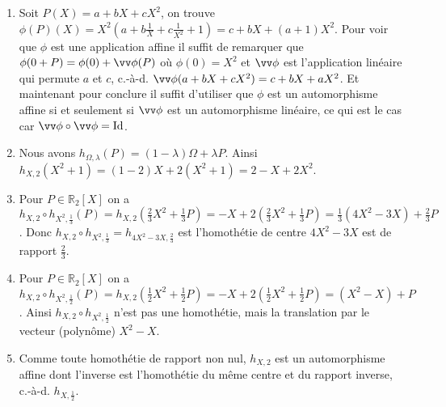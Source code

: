\documentclass[a4paper,12pt,reqno]{amsart}
\begin{document}
\begin{solution}
  \begin{enumerate}
    \item Soit $P(X)=a+bX+cX^{2}$, on trouve $\phi(P)(X) = X^{2}\left( a+b\frac{1}{X}+c\frac{1}{X^{2}} + 1 \right) = c+bX+(a+1)X^{2}$. Pour voir que $\phi$ est une application affine il suffit de remarquer que $\phi(0+P) = \phi(0) + \vv\phi(P)$ où $\phi(0) = X^{2}$ et $\vv\phi$ est l'application linéaire qui permute $a$ et $c$, c.-à-d. $\vv\phi(a+bX+cX^{2}) = c+bX+aX^{2}$. Et maintenant pour conclure il suffit d'utiliser que $\phi$ est un automorphisme affine si et seulement si $\vv\phi$ est un automorphisme linéaire, ce qui est le cas car $\vv\phi\circ\vv\phi=\id$.
    \item Nous avons $h_{\Omega,\lambda}(P) = (1- \lambda)\Omega+\lambda P$. Ainsi $h_{X,2}(X^{2}+1) = (1-2)X+2(X^{2}+1) = 2-X+2X^{2}$.
    \item Pour $P \in \mathbb{R}_{2}[X]$ on a $h_{X,2}\circ h_{X^{2},\frac{1}{3}}(P) = h_{X,2}\left(\frac{2}{3}X^{2}+\frac{1}{3}P\right) = -X+2\left(\frac{2}{3}X^{2}+\frac{1}{3}P\right)= \frac{1}{3}\left( 4X^{2}-3X \right)+\frac{2}{3}P$. Donc $h_{X,2}\circ h_{X^{2},\frac{1}{3}} = h_{4X^{2}-3X,\frac{2}{3}}$ est l'homothétie de centre $4X^{2}-3X$ est de rapport $\frac{2}{3}$.
    \item Pour $P \in \mathbb{R}_{2}[X]$ on a $h_{X,2}\circ h_{X^{2},\frac{1}{2}}(P) = h_{X,2}\left(\frac{1}{2}X^{2}+\frac{1}{2}P\right) = -X+2\left(\frac{1}{2}X^{2}+\frac{1}{2}P\right)= ( X^{2}-X )+P$. Ainsi $h_{X,2}\circ h_{X^{2},\frac{1}{2}}$ n'est pas une homothétie, mais la translation par le vecteur (polynôme) $X^{2}-X$.
    \item Comme toute homothétie de rapport non nul, $h_{X,2}$ est un automorphisme affine dont l'inverse est l'homothétie du même centre et du rapport inverse, c.-à-d.  $h_{X,\frac{1}{2}}$.
  \end{enumerate}
\end{solution}

\ifsolutions\else\vspace{7mm}\fi
\end{document}
